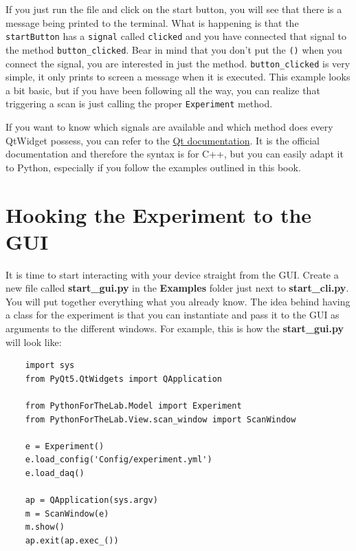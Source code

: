 If you just run the file and click on the start button, you will see
that there is a message being printed to the terminal. What is happening
is that the \texttt{startButton} has a \texttt{signal} called
\texttt{clicked} and you have connected that signal to the method
\texttt{button_clicked}. Bear in mind that you don't put the
\texttt{()} when you connect the signal, you are interested in just the
method. \texttt{button_clicked} is very simple, it only prints to
screen a message when it is executed. This example looks a bit basic,
but if you have been following all the way, you can realize that
triggering a scan is just calling the proper \texttt{Experiment} method.


If you want to know which signals are available and which method does
every QtWidget possess, you can refer to the
\href{http://doc.qt.io/qt-5/qtwidgets-module.html}{Qt documentation}. It
is the official documentation and therefore the syntax is for C++, but
you can easily adapt it to Python, especially if you follow the examples
outlined in this book.


\section{Hooking the Experiment to the GUI}\label{hooking-the-experiment-to-the-gui}
It is time to start interacting with your device straight from the
{GUI}. Create a new file called \textbf{start\_gui.py} in the
\textbf{Examples} folder just next to \textbf{start\_cli.py}. You will
put together everything what you already know. The idea behind having a
class for the experiment is that you can instantiate and pass it to the
{GUI} as arguments to the different windows. For example, this is how
the \textbf{start\_gui.py} will look like:

\begin{verbatim}
    import sys
    from PyQt5.QtWidgets import QApplication

    from PythonForTheLab.Model import Experiment
    from PythonForTheLab.View.scan_window import ScanWindow

    e = Experiment()
    e.load_config('Config/experiment.yml')
    e.load_daq()

    ap = QApplication(sys.argv)
    m = ScanWindow(e)
    m.show()
    ap.exit(ap.exec_())
\end{verbatim}

